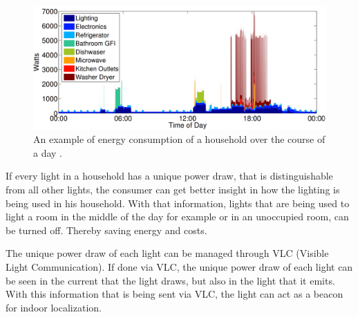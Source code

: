 \begin{figure}
	\centering
	\includegraphics[width=\textwidth]{chapters/introduction-chapters/energy-consumption-house.png}
	\caption{An example of energy consumption of a household over the course of a day \cite{kolter2011redd}.}
	\label{fig:energy-consumption-house}
\end{figure}




If every light in a household has a unique power draw, that is distinguishable from all other lights, the consumer can get better insight in how the lighting is being used in his household. 
With that information, lights that are being used to light a room in the middle of the day for example or in an unoccupied room, can be turned off.
Thereby saving energy and costs.


The unique power draw of each light can be managed through VLC (Visible Light Communication).
If done via VLC, the unique power draw of each light can be seen in the current that the light draws, but also in the light that it emits.
With this information that is being sent via VLC, the light can act as a beacon for indoor localization.


















